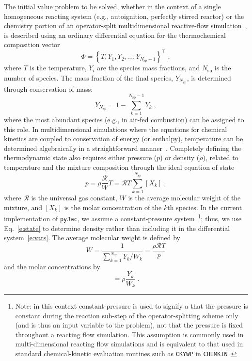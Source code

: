 \documentclass[preprint,12pt]{elsarticle}
\newcommand{ \numsp }{N_{\text{sp}}}
\begin{document}
The initial value problem to be solved, whether in the context of a single homogeneous reacting system (e.g., autoignition, perfectly stirred reactor) or the chemistry portion of an operator-split multidimensional reactive-flow simulation~\cite{Oran:2001aa}, is described using an ordinary differential equation for the thermochemical composition vector
\begin{equation}
\label{e:vars}
\Phi = \left \lbrace T, Y_1, Y_2, \dotsc, Y_{\numsp - 1} \right \rbrace^{\intercal} \;,
\end{equation}
where $T$ is the temperature, $Y_i$ are the species mass fractions, and $\numsp$ is the number of species.
The mass fraction of the final species, $Y_{\numsp}$, is determined through conservation of mass:
\begin{equation}
Y_{\numsp} = 1 - \sum_{k=1}^{\numsp - 1} Y_k \;,
\label{e:y_nsp}
\end{equation}
where the most abundant species (e.g.,  in air-fed combustion) can be assigned to this role.
In multidimensional simulations where the equations for chemical kinetics are coupled to conservation of energy (or enthalpy), temperature can be determined algebraically in a straightforward manner~\cite{Oran:2001aa}.
Completely defining the thermodynamic state also requires either pressure ($p$) or density ($\rho$), related to temperature and the mixture composition through the ideal equation of state
\begin{equation}
\label{e:state}
p = \rho \frac{\mathcal{R}}{W} T = \mathcal{R} T \sum_{k=1}^{\numsp} [X_k] \;,
\end{equation}
where $\mathcal{R}$ is the universal gas constant, $W$ is the average molecular weight of the mixture, and $[X_k]$ is the molar concentration of the $k$th species.
In the current implementation of \texttt{pyJac}, we assume a constant-pressure system~\footnote{Note: in this context constant-pressure is used to signify a that the pressure is constant during the reaction sub-step of the operator-splitting scheme only (and is thus an input variable to the problem), not that the pressure is fixed throughout a reacting flow simulation.  This assumption is commonly used in multi-dimensional reacting flow simulations and is equivalent to that used in standard chemical-kinetic evaluation routines such as \texttt{CKYWP} in \texttt{CHEMKIN}~\cite{chemkin:2012}}; thus, we use Eq.~\eqref{e:state} to determine density rather than including it in the differential system~\eqref{e:vars}.
The average molecular weight is defined by
\begin{equation}
W = \frac{1}{\sum_{k=1}^{\numsp} Y_k / W_k} = \frac{\rho \mathcal{R} T}{p}
\end{equation}
and the molar concentrations by
\begin{equation}
[X_k] = \rho \frac{Y_k}{W_k} \;.
\end{equation}
\end{document}
